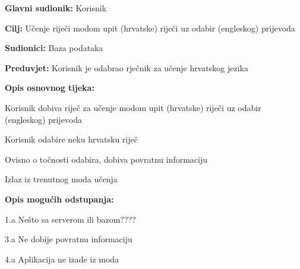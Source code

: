 					\noindent {}
					\begin{packed_item}
						\item \textbf{Glavni sudionik:} Korisnik
						\item \textbf{Cilj:} Učenje riječi modom upit (hrvatske) riječi uz odabir (engleskog) prijevoda
						\item \textbf{Sudionici:} Baza podataka
						\item \textbf{Preduvjet:} Korisnik je odabrao rječnik za učenje hrvatskog jezika
						\item \textbf{Opis osnovnog tijeka:}
						\begin{packed_enum}
							\item Korisnik dobiva riječ za učenje modom upit (hrvatske) riječi uz odabir (engleskog) prijevoda
							\item Korisnik odabire neku hrvatsku riječ
							\item Ovisno o točnosti odabira, dobiva povratnu informaciju
							\item Izlaz iz trenutnog moda učenja
						\end{packed_enum}
						\item \textbf{Opis mogućih odstupanja:}
						\begin{packed_item}
							\item 1.a Nešto sa serverom ili bazom????
							\item 3.a Ne dobije povratnu informaciju
							\item 4.a Aplikacija ne izade iz moda
						\end{packed_item}
					\end{packed_item}

